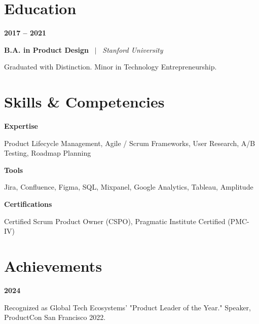 \documentclass[10pt,letterpaper]{article}
\newcommand{\timelineEntry}[4]{
  \vspace{6pt}
  \noindent
  \begin{minipage}[t]{0.22\textwidth}
    \textbf{\color{brand}#1}
  \end{minipage}%
  \begin{minipage}[t]{0.78\textwidth}
    \textbf{\color{textdark}#2} \ $|$ \ \textit{#3} \\ \vspace{2pt}
    #4
  \end{minipage}
  \vspace{4pt}
}
\newcommand{\skillRow}[2]{
  \vspace{6pt}
  \noindent
  \begin{minipage}[t]{0.22\textwidth}
    \textbf{\color{brand}#1}
  \end{minipage}%
  \begin{minipage}[t]{0.78\textwidth}
    #2
  \end{minipage}
  \vspace{4pt}
}
\begin{document}
\section{Education}
\timelineEntry{2017 -- 2021}{B.A. in Product Design}{Stanford University}{
  Graduated with Distinction. Minor in Technology Entrepreneurship.
}

\section{Skills \& Competencies}
\skillRow{Expertise}{Product Lifecycle Management, Agile / Scrum Frameworks, User Research, A/B Testing, Roadmap Planning}
\skillRow{Tools}{Jira, Confluence, Figma, SQL, Mixpanel, Google Analytics, Tableau, Amplitude}
\skillRow{Certifications}{Certified Scrum Product Owner (CSPO), Pragmatic Institute Certified (PMC-IV)}

\section{Achievements}
\skillRow{2024}{Recognized as Global Tech Ecosystems' "Product Leader of the Year." Speaker, ProductCon San Francisco 2022.}
\end{document}
